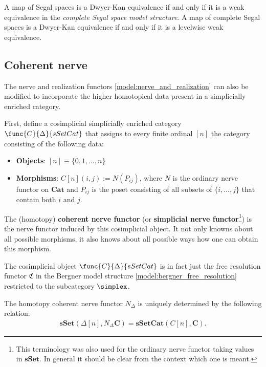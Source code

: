     \begin{property}
        A map of Segal spaces is a Dwyer-Kan equivalence if and only if it is a weak equivalence in the \textit{complete Segal space model structure}. A map of complete Segal spaces is a Dwyer-Kan equivalence if and only if it is a levelwise weak equivalence.
    \end{property}

\subsection{Coherent nerve}

    The nerve and realization functors \ref{model:nerve_and_realization} can also be modified to incorporate the higher homotopical data present in a simplicially enriched category.

    First, define a cosimplicial simplicially enriched category $\func{C}{\Delta}{sSetCat}$ that assigns to every finite ordinal $[n]$ the category consisting of the following data:
    \begin{itemize}
        \item\textbf{Objects}: $[n]\equiv\{0,1,\ldots,n\}$
        \item\textbf{Morphisms}: $C[n](i,j) := N(P_{ij})$, where $N$ is the ordinary nerve functor on $\mathbf{Cat}$ and $P_{ij}$ is the poset consisting of all subsets of $\{i,\ldots,j\}$ that contain both $i$ and $j$.
    \end{itemize}
    The (homotopy) \textbf{coherent nerve functor} (or \textbf{simplicial nerve functor}\footnote{This terminology was also used for the ordinary nerve functor taking values in $\mathbf{sSet}$. In general it should be clear from the context which one is meant.}) is the nerve functor induced by this cosimplicial object. It not only knowns about all possible morphisms, it also knows about all possible ways how one can obtain this morphism.
    \begin{remark}
        The cosimplicial object $\func{C}{\Delta}{sSetCat}$ is in fact just the free resolution functor $\mathfrak{C}$ in the Bergner model structure \ref{model:bergner_free_resolution} restricted to the subcategory $\simplex$.
    \end{remark}

    \begin{property}
        The homotopy coherent nerve functor $N_\Delta$ is uniquely determined by the following relation:
        \begin{gather}
            \mathbf{sSet}(\Delta[n],N_\Delta\mathbf{C})=\mathbf{sSetCat}(C[n],\mathbf{C}).
        \end{gather}
    \end{property}

